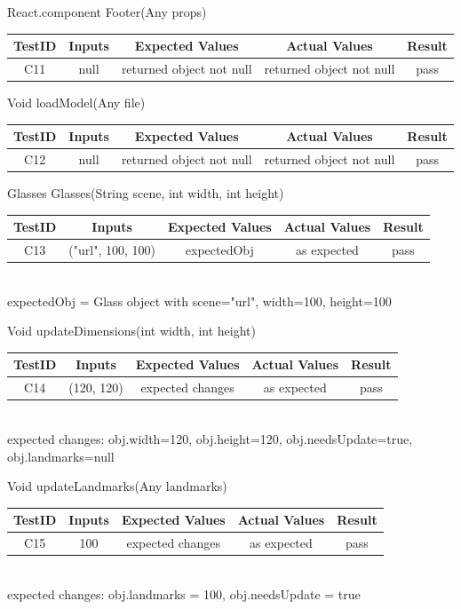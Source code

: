 \documentclass[12pt, titlepage]{article}
\begin{document}
React.component Footer(Any props) \\
\begin{tabular}{ |c|c|c|c|c| } 
 \hline
 TestID & Inputs & Expected Values & Actual Values & Result \\ 
 \hline
 C11 & null & returned object not null & returned object not null & pass \\ 
 \hline
\end{tabular}

Void loadModel(Any file) \\
\begin{tabular}{ |c|c|c|c|c| } 
 \hline
 TestID & Inputs & Expected Values & Actual Values & Result \\ 
 \hline
 C12 & null & returned object not null & returned object not null & pass \\ 
 \hline
\end{tabular}

Glasses Glasses(String scene, int width, int height) \\
\begin{tabular}{ |c|c|c|c|c| } 
 \hline
 TestID & Inputs & Expected Values & Actual Values & Result \\ 
 \hline
 C13 & ("url", 100, 100) & expectedObj & as expected & pass \\ 
 \hline
\end{tabular}
\\
expectedObj = Glass object with scene="url", width=100, height=100

Void updateDimensions(int width, int height)\\
\begin{tabular}{ |c|c|c|c|c| } 
 \hline
 TestID & Inputs & Expected Values & Actual Values & Result \\ 
 \hline
 C14 & (120, 120) & expected changes & as expected & pass \\ 
 \hline
\end{tabular}
\\
expected changes: obj.width=120, obj.height=120, obj.needsUpdate=true, obj.landmarks=null

Void updateLandmarks(Any landmarks)\\
\begin{tabular}{ |c|c|c|c|c| } 
 \hline
 TestID & Inputs & Expected Values & Actual Values & Result \\ 
 \hline
 C15 & 100 & expected changes & as expected & pass \\ 
 \hline
\end{tabular}
\\
expected changes: obj.landmarks = 100, obj.needsUpdate = true
\end{document}
